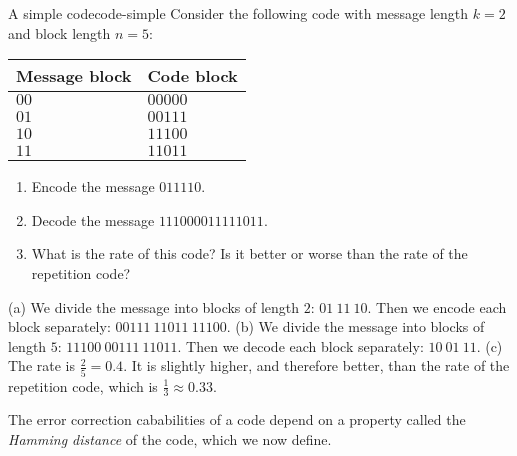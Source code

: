 \begin{example}{A simple code}{code-simple}
  Consider the following code with message length $k=2$ and block
  length $n=5$:
  \begin{center}
    \begin{tabular}{|l|l|}
      \hline
      Message block & Code block \\\hline
      $00$ & $00000$ \\
      $01$ & $00111$ \\
      $10$ & $11100$ \\
      $11$ & $11011$ \\\hline
    \end{tabular}
  \end{center}
  \begin{enumialphparenastyle}
    \begin{enumerate}
    \item Encode the message $011110$.
    \item Decode the message $111000011111011$.
    \item What is the rate of this code? Is it better or worse than
      the rate of the repetition code?
    \end{enumerate}
  \end{enumialphparenastyle}
\end{example}

\begin{solution}
  (a) We divide the message into blocks of length $2$:
  $01~11~10$. Then we encode each block separately:
  $00111~11011~11100$. (b) We divide the message into blocks of length
  $5$: $11100~00111~11011$. Then we decode each block separately:
  $10~01~11$. (c) The rate is $\frac{2}{5}=0.4$. It is slightly
  higher, and therefore better, than the rate of the repetition code,
  which is $\frac{1}{3}\approx 0.33$.
\end{solution}

The error correction cababilities of a code depend on a property
called the \textit{Hamming distance} of the code, which we now define.

